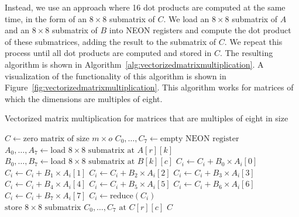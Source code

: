 \documentclass[11pt,a4paper]{report}
\theoremstyle{definition}
\begin{document}
Instead, we use an approach where 16 dot products are computed at the same time, in the form of an $8\times8$ submatrix of $C$. We load an $8\times8$ submatrix of $A$ and an $8\times8$ submatrix of $B$ into NEON registers and compute the dot product of these submatrices, adding the result to the submatrix of $C$. We repeat this process until all dot products are computed and stored in $C$. The resulting algorithm is shown in Algorithm~\ref{alg:vectorizedmatrixmultiplication}. A visualization of the functionality of this algorithm is shown in Figure~\ref{fig:vectorizedmatrixmultiplication}. This algorithm works for matrices of which the dimensions are multiples of eight.

\begin{algorithm}
  \caption{Vectorized matrix multiplication for matrices that are multiples of eight in size}
  \label{alg:vectorizedmatrixmultiplication}
  \begin{algorithmic}[1]
    \State $C \gets \text{zero matrix of size } m \times o$
    \State $C_0, \dots, C_7 \gets \text{empty NEON register}$
    \State $A_0, \dots, A_7 \gets \text{load } 8\times8 \text{ submatrix at } A[r][k]$
    \State $B_0, \dots, B_7 \gets \text{load } 8\times8 \text{ submatrix at } B[k][c]$
    \State $C_i \gets C_i + B_0 \times A_i[0]$
    \State $C_i \gets C_i + B_1 \times A_i[1]$
    \State $C_i \gets C_i + B_2 \times A_i[2]$
    \State $C_i \gets C_i + B_3 \times A_i[3]$
    \State $C_i \gets C_i + B_4 \times A_i[4]$
    \State $C_i \gets C_i + B_5 \times A_i[5]$
    \State $C_i \gets C_i + B_6 \times A_i[6]$
    \State $C_i \gets C_i + B_7 \times A_i[7]$
    \EndFor
    \EndFor
    \State $C_i \gets \text{reduce}(C_i)$
    \EndFor
    \State $\text{store } 8\times8 \text{ submatrix } C_0, \dots, C_7 \text{ at } C[r][c]$
    \EndFor
    \EndFor
    \State \Return $C$
    \EndFunction
  \end{algorithmic}
\end{algorithm}
\end{document}
